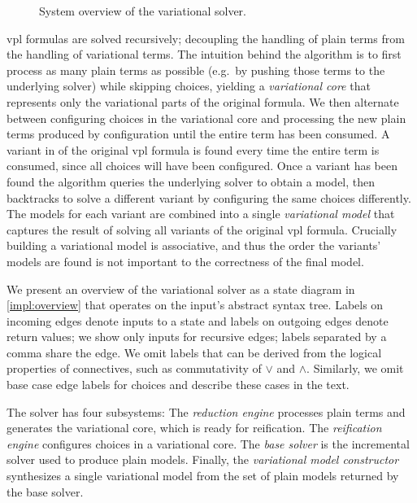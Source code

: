 \label{section:vsat:approach}
%
\begin{figure}
  \centering
    
    \caption{System overview of the variational solver.}%
    \label{impl:overview}
\end{figure}

\ac{vpl} formulas are solved recursively; decoupling the handling of plain terms
from the handling of variational terms.
%
The intuition behind the algorithm is to first process as many plain terms as
possible (e.g.\ by pushing those terms to the underlying solver) while skipping
choices, yielding a \emph{variational core} that represents only the variational
parts of the original formula. We then alternate between configuring choices in
the variational core and processing the new plain terms produced by
configuration until the entire term has been consumed.
%
A variant in of the original \ac{vpl} formula is found every time the entire
term is consumed, since all choices will have been configured. Once a variant
has been found the algorithm queries the underlying solver to obtain a model,
then backtracks to solve a different variant by configuring the same choices
differently. The models for each variant are combined into a single
\emph{variational model} that captures the result of solving all variants of the
original \ac{vpl} formula. Crucially building a variational model is
associative, and thus the order the variants' models are found is not important
to the correctness of the final model.

We present an overview of the variational solver as a state diagram in
\autoref{impl:overview} that operates on the input's abstract syntax tree.
Labels on incoming edges denote inputs to a state and labels on outgoing edges
denote return values; we show only inputs for recursive edges; labels separated
by a comma share the edge. We omit labels that can be derived from the logical
properties of connectives, such as commutativity of $\vee$ and $\wedge$.
Similarly, we omit base case edge labels for choices and describe these cases
in the text.

The solver has four subsystems: The \emph{reduction engine} processes plain
terms and generates the variational core, which is ready for reification.
The \emph{reification engine} configures choices in a variational core. The
\textit{base solver} is the incremental solver used to produce plain models.
Finally, the \emph{variational model constructor} synthesizes a single
variational model from the set of plain models returned by the base solver.

